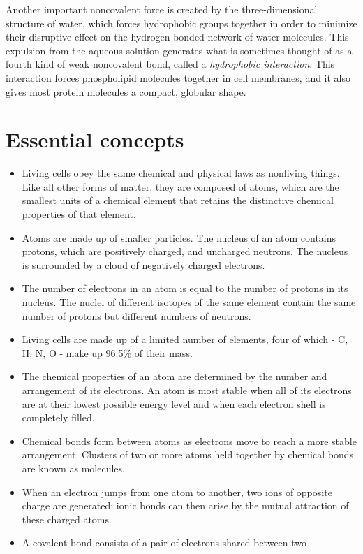Another important noncovalent force is created by the three-dimensional
structure of water, which forces hydrophobic groups together in order to
minimize their disruptive effect on the hydrogen-bonded network of water
molecules. This expulsion from
the aqueous solution generates what is sometimes thought of as a fourth
kind of weak noncovalent bond, called a \textit{hydrophobic interaction}. This
interaction forces phospholipid molecules together in cell membranes,
and it also gives most protein molecules a compact, globular shape.


\section{Essential concepts}

\begin{itemize}
\item Living cells obey the same chemical and physical laws as nonliving
things. Like all other forms of matter, they are composed of atoms,
which are the smallest units of a chemical element that retains the
distinctive chemical properties of that element.
\item Atoms are made up of smaller particles. The nucleus of an atom
contains protons, which are positively charged, and uncharged neutrons.
The nucleus is surrounded by a cloud of negatively charged
electrons.
\item The number of electrons in an atom is equal to the number of protons
in its nucleus. The nuclei of different isotopes of the same
element contain the same number of protons but different numbers
of neutrons.
\item Living cells are made up of a limited number of elements, four of
which - C, H, N, O - make up 96.5\% of their mass.
\item The chemical properties of an atom are determined by the number
and arrangement of its electrons. An atom is most stable when all of
its electrons are at their lowest possible energy level and when each
electron shell is completely filled.
\item Chemical bonds form between atoms as electrons move to reach
a more stable arrangement. Clusters of two or more atoms held
together by chemical bonds are known as molecules.
\item When an electron jumps from one atom to another, two ions of opposite
charge are generated; ionic bonds can then arise by the mutual
attraction of these charged atoms.
\item A covalent bond consists of a pair of electrons shared between two

\end{itemize}

